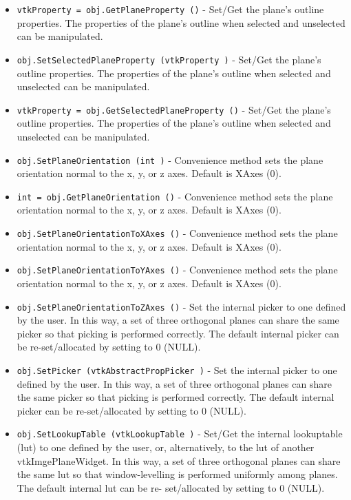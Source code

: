 \begin{itemize}
\item  \verb|vtkProperty = obj.GetPlaneProperty ()| -  Set/Get the plane's outline properties. The properties of the plane's 
 outline when selected and unselected can be manipulated.

\item  \verb|obj.SetSelectedPlaneProperty (vtkProperty )| -  Set/Get the plane's outline properties. The properties of the plane's 
 outline when selected and unselected can be manipulated.

\item  \verb|vtkProperty = obj.GetSelectedPlaneProperty ()| -  Set/Get the plane's outline properties. The properties of the plane's 
 outline when selected and unselected can be manipulated.

\item  \verb|obj.SetPlaneOrientation (int )| -  Convenience method sets the plane orientation normal to the
 x, y, or z axes.  Default is XAxes (0).

\item  \verb|int = obj.GetPlaneOrientation ()| -  Convenience method sets the plane orientation normal to the
 x, y, or z axes.  Default is XAxes (0).

\item  \verb|obj.SetPlaneOrientationToXAxes ()| -  Convenience method sets the plane orientation normal to the
 x, y, or z axes.  Default is XAxes (0).

\item  \verb|obj.SetPlaneOrientationToYAxes ()| -  Convenience method sets the plane orientation normal to the
 x, y, or z axes.  Default is XAxes (0).

\item  \verb|obj.SetPlaneOrientationToZAxes ()| -  Set the internal picker to one defined by the user.  In this way,
 a set of three orthogonal planes can share the same picker so that
 picking is performed correctly.  The default internal picker can be
 re-set/allocated by setting to 0 (NULL).

\item  \verb|obj.SetPicker (vtkAbstractPropPicker )| -  Set the internal picker to one defined by the user.  In this way,
 a set of three orthogonal planes can share the same picker so that
 picking is performed correctly.  The default internal picker can be
 re-set/allocated by setting to 0 (NULL).

\item  \verb|obj.SetLookupTable (vtkLookupTable )| -  Set/Get the internal lookuptable (lut) to one defined by the user, or,
 alternatively, to the lut of another vtkImgePlaneWidget.  In this way,
 a set of three orthogonal planes can share the same lut so that
 window-levelling is performed uniformly among planes.  The default
 internal lut can be re- set/allocated by setting to 0 (NULL).


\end{itemize}
